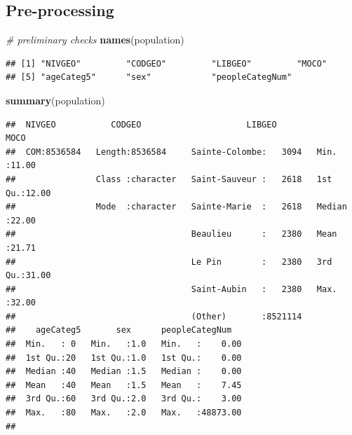 \documentclass[]{article}
\newenvironment{Shaded}{\begin{snugshade}}{\end{snugshade}}
\newcommand{\KeywordTok}[1]{\textcolor[rgb]{0.13,0.29,0.53}{\textbf{#1}}}
\newcommand{\CommentTok}[1]{\textcolor[rgb]{0.56,0.35,0.01}{\textit{#1}}}
\newcommand{\NormalTok}[1]{#1}
\begin{document}
\subsection{Pre-processing}\label{pre-processing-3}

\begin{Shaded}
\begin{Highlighting}[]
\CommentTok{# preliminary checks}
\KeywordTok{names}\NormalTok{(population)}
\end{Highlighting}
\end{Shaded}

\begin{verbatim}
## [1] "NIVGEO"         "CODGEO"         "LIBGEO"         "MOCO"          
## [5] "ageCateg5"      "sex"            "peopleCategNum"
\end{verbatim}

\begin{Shaded}
\begin{Highlighting}[]
\KeywordTok{summary}\NormalTok{(population)}
\end{Highlighting}
\end{Shaded}

\begin{verbatim}
##  NIVGEO           CODGEO                     LIBGEO             MOCO      
##  COM:8536584   Length:8536584     Sainte-Colombe:   3094   Min.   :11.00  
##                Class :character   Saint-Sauveur :   2618   1st Qu.:12.00  
##                Mode  :character   Sainte-Marie  :   2618   Median :22.00  
##                                   Beaulieu      :   2380   Mean   :21.71  
##                                   Le Pin        :   2380   3rd Qu.:31.00  
##                                   Saint-Aubin   :   2380   Max.   :32.00  
##                                   (Other)       :8521114                  
##    ageCateg5       sex      peopleCategNum    
##  Min.   : 0   Min.   :1.0   Min.   :    0.00  
##  1st Qu.:20   1st Qu.:1.0   1st Qu.:    0.00  
##  Median :40   Median :1.5   Median :    0.00  
##  Mean   :40   Mean   :1.5   Mean   :    7.45  
##  3rd Qu.:60   3rd Qu.:2.0   3rd Qu.:    3.00  
##  Max.   :80   Max.   :2.0   Max.   :48873.00  
## 
\end{verbatim}
\end{document}
